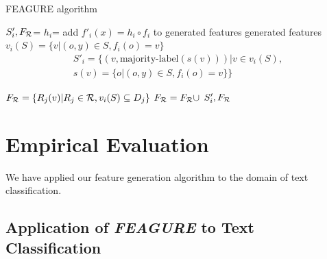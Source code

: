 \documentclass{article}
\theoremstyle{definition}
\begin{document}
\begin{algorithm}[H]
	\caption{FEAGURE algorithm}
	\label{code-creating-prob}
	\small
	\begin{algorithmic}
		\State $S'_i,F_{\cal R}$=  %
		\State $h_i$=  
		\State add $f'_i(x)=h_i\circ f_i$ to generated features
		\EndFor
		\State \Return generated features
		\EndFunction
		\State 
		\State $v_i(S) = \{v | (o,y) \in S, f_{i}(o)=v\}$
			\begin{multline*}
		S'_i = \{ (v, \mbox{majority-label}(s(v))) | v \in v_i(S),\\
		 s(v)=\{o | (o,y)\in S, f_{i}(o)=v\} \}
		\end{multline*}

		
		\State $F_{\cal R}=\{R_j(v)| R_j\in{\cal R}, v_i(S)\subseteq D_j\}$
		\State $F_{\cal R}=F_{\cal R}\cup$
		\EndIf
		\State \Return $S'_i, F_{\cal R}$ 
		\EndFunction
		
	\end{algorithmic}
\end{algorithm}


\section{Empirical Evaluation}
We have applied our feature generation algorithm to the domain of text classification. %

\subsection{Application of \emph{FEAGURE} to Text Classification} \label{text-feagure}

\end{document}
